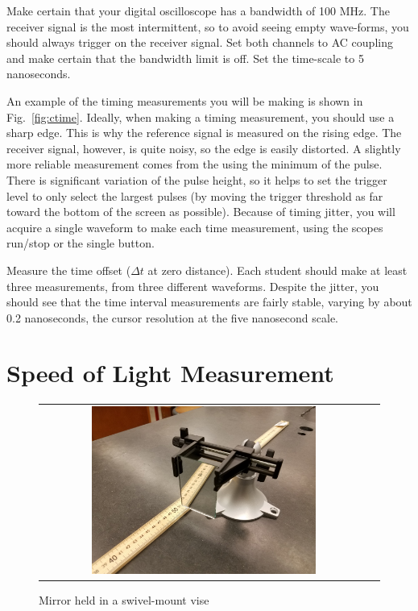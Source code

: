 Make certain that your digital oscilloscope has a bandwidth of 100
MHz.  The receiver signal is the most intermittent, so to avoid seeing
empty wave-forms, you should always trigger on the receiver signal.
Set both channels to AC coupling and make certain that the bandwidth
limit is off.  Set the time-scale to 5 nanoseconds.


An example of the timing measurements you will be making is shown in
Fig.~\ref{fig:ctime}.  Ideally, when making a timing measurement, you
should use a sharp edge.  This is why the reference signal is measured
on the rising edge.  The receiver signal, however, is quite noisy, so
the edge is easily distorted.  A slightly more reliable measurement
comes from the using the minimum of the pulse.  There is significant
variation of the pulse height, so it helps to set the trigger level to
only select the largest pulses (by moving the trigger threshold as far
toward the bottom of the screen as possible).  Because of timing
jitter, you will acquire a single waveform to make each time
measurement, using the scopes run/stop or the single button.

\begin{measurement}
Measure the time offset ($\Delta t$ at zero distance).  Each student
should make at least three measurements, from three different
waveforms.  Despite the jitter, you should see that the time interval
measurements are fairly stable, varying by about 0.2 nanoseconds, the
cursor resolution at the five nanosecond scale.
\end{measurement}

\section{Speed of Light Measurement}

\begin{figure}[htbp]
\begin{center}
\begin{tabular}{cc}
\includegraphics[width=0.7\textwidth]{figs/labs/c_air/mirror.jpg}
\end{tabular}
\end{center}
\caption{\label{fig:mirror} Mirror held in a swivel-mount vise}
\end{figure}

